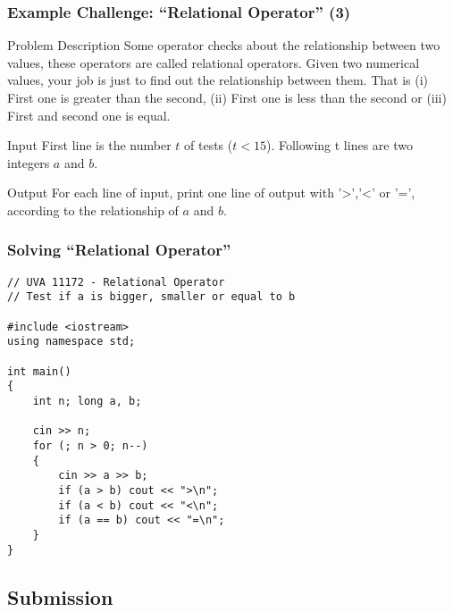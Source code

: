 \documentclass{beamer}
\begin{document}
\begin{frame}
  \frametitle{Example Challenge: ``Relational Operator'' (3)}
  
  \begin{block}{Problem Description}
    {\small 
      Some operator checks about the relationship between two values,
      these operators are called relational operators. Given two
      numerical values, your job is just to find out the relationship
      between them. That is (i) First one is greater than the second,
      (ii) First one is less than the second or (iii) First and second
      one is equal.
    }
  \end{block}
  \begin{block}{Input}
    {\small
      First line is the number $t$ of tests ($t < 15$). Following t lines 
      are two integers $a$ and $b$.
    }
  \end{block}
  \begin{block}{Output}
    {\small
      For each line of input, print one line of output with '>','<' or '=', 
      according to the relationship of $a$ and $b$.
    }
  \end{block}
\end{frame}



\begin{frame}[fragile]
  \frametitle{Solving ``Relational Operator''}
    
\begin{block}{}
{\smaller
\begin{verbatim}
// UVA 11172 - Relational Operator
// Test if a is bigger, smaller or equal to b

#include <iostream>
using namespace std;

int main()
{
    int n; long a, b;

    cin >> n;    
    for (; n > 0; n--)
    {
        cin >> a >> b;
        if (a > b) cout << ">\n";
        if (a < b) cout << "<\n";
        if (a == b) cout << "=\n";
    }
}
\end{verbatim}}
\end{block}
\end{frame}

\subsection{Submission}
\end{document}
